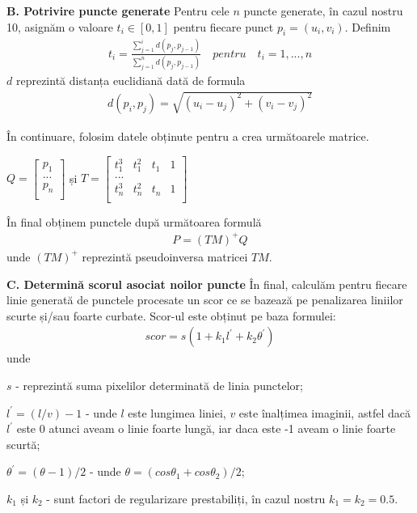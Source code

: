 \textbf{B. Potrivire puncte generate}
Pentru cele $n$ puncte generate, în cazul nostru 10, asignăm o valoare $t_i \in [0, 1]$ pentru fiecare punct $p_i = (u_i, v_i)$. Definim
\begin{align}
	t_i = \frac{\sum_{j = 1}^{i} d(p_j,p_{j-1})}{\sum_{j = 1}^{n} d(p_j,p_{j-1})} \quad pentru \quad t_i = 1, ..., n
\end{align}
$d$ reprezintă distanța euclidiană dată de formula
\begin{align}
	d(p_i,p_j) = \sqrt{(u_i - u_j)^2 + (v_i - v_j)^2}
\end{align}

În continuare, folosim datele obținute pentru a crea următoarele matrice.
\begin{center}
	$ Q = 
	\begin{bmatrix}
	p_1 \\
	... \\
	p_n \\
	\end{bmatrix}
	$ și $ T = 
	\begin{bmatrix}
	t_1^3 & t_1^2 & t_1 & 1 \\
	...\\
	t_n^3 & t_n^2 & t_n & 1\\
	\end{bmatrix}
	$
\end{center}

În final obținem punctele după următoarea formulă
\begin{align}
	P = (TM)^+Q
\end{align}
unde $(TM)^+$ reprezintă pseudoinversa matricei $TM$.

\textbf{C. Determină scorul asociat noilor puncte}
În final, calculăm pentru fiecare linie generată de punctele procesate un scor ce se bazează pe penalizarea liniilor scurte și/sau foarte curbate. Scor-ul este obținut pe baza formulei:
\begin{align}
	scor = s(1 + k_1l^{'}+k_2\theta^{'})
\end{align}
unde

$s$ - reprezintă suma pixelilor determinată de linia punctelor;

$l^{'} = (l/v) - 1$ - unde $l$ este lungimea liniei, $v$ este înalțimea imaginii, astfel dacă $l^{'}$ este 0 atunci aveam o linie foarte lungă, iar daca este -1 aveam o linie foarte scurtă;

$\theta^{'} = (\theta - 1)/2$ - unde $\theta = (cos\theta_1 + cos\theta_2)/2$;

$k_1$ și $k_2$ - sunt factori de regularizare prestabiliți, în cazul nostru $k_1 = k_2 = 0.5$.

